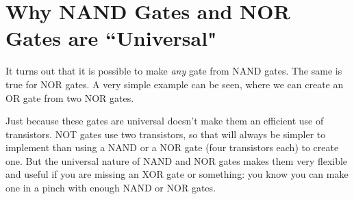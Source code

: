 \section{Why NAND Gates and NOR Gates are ``Universal"}

It turns out that it is possible to make \emph{any} gate from NAND gates. The same is true for NOR gates. A very simple example can be seen, where we can create an OR gate from two NOR gates. 






Just because these gates are universal doesn't make them an efficient use of transistors. NOT gates use two transistors, so that will always be simpler to implement than using a NAND or a NOR gate (four transistors each) to create one. But the universal nature of NAND and NOR gates makes them very flexible and useful if you are missing an XOR gate or something: you know you can make one in a pinch with enough NAND or NOR gates.